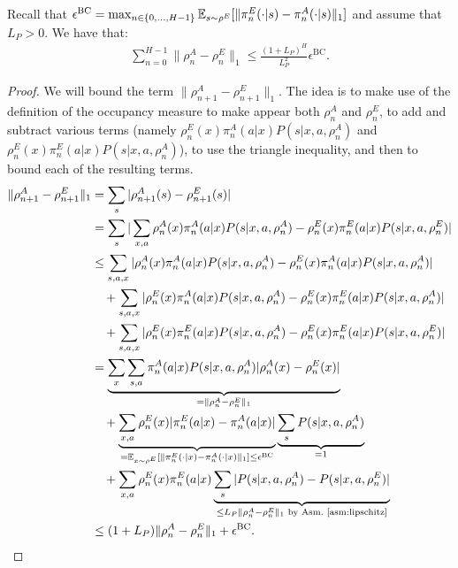 \documentclass{article}
\begin{document}
\begin{lemma}
\label{lem:bc-error-state-distr}
   Recall that $\epsilon^\mathrm{BC} = \max_{n\in\{0,\dots,H-1\}} \mathbb{E}_{s\sim\rho^E}[\|\pi_n^E(\cdot|s) - \pi_n^A(\cdot|s)\|_1]$ and assume that $L_P>0$. We have that:
    \begin{align}
        \sum_{n=0}^{H-1} \|\rho_{n}^A - \rho_{n}^E\|_1 
        \leq \frac{(1+L_P)^H}{L_P^2}\epsilon^\mathrm{BC}.
    \end{align}
\end{lemma}
\begin{proof}
We will bound the term $\|\rho_{n+1}^A - \rho_{n+1}^E\|_1$. The idea is to make use of the definition of the occupancy measure to make appear both $\rho_n^A$ and $\rho_n^E$, to add and subtract various terms (namely $\rho_{n}^E(x)\pi_n^A(a|x) P(s|x,a,\rho_n^A)$ and $\rho_{n}^E(x)\pi_n^E(a|x) P(s|x,a,\rho_n^A)$), to use the triangle inequality, and then to bound each of the resulting terms.
\begin{align}
    \|\rho_{n+1}^A - \rho_{n+1}^E\|_1
    &= \sum_s |\rho_{n+1}^A(s) - \rho_{n+1}^E(s)|
    \\
    &= \sum_s |\sum_{x,a} \rho_{n}^A(x)\pi_n^A(a|x) P(s|x,a,\rho_n^A) - \rho_{n}^E(x)\pi_n^E(a|x) P(s|x,a,\rho_n^E)|
    \\
    &\leq \sum_{s,a,x} |\rho_{n}^A(x)\pi_n^A(a|x) P(s|x,a,\rho_n^A) - \rho_{n}^E(x)\pi_n^A(a|x) P(s|x,a,\rho_n^A)|
    \\ &\quad 
    + \sum_{s,a,x} | \rho_{n}^E(x)\pi_n^A(a|x) P(s|x,a,\rho_n^A) - \rho_{n}^E(x)\pi_n^E(a|x) P(s|x,a,\rho_n^A)|
    \\ &\quad 
    + \sum_{s,a,x} | \rho_{n}^E(x)\pi_n^E(a|x) P(s|x,a,\rho_n^A)- \rho_{n}^E(x)\pi_n^E(a|x) P(s|x,a,\rho_n^E)|
    \\
    &= \underbrace{\sum_x \sum_{s,a} \pi_n^A(a|x) P(s|x,a,\rho_n^A) |\rho_{n}^A(x) - \rho_{n}^E(x)|}_{= \|\rho_{n}^A - \rho_{n}^E\|_1}
    \\ &\quad 
    + \underbrace{\sum_{x,a} \rho_{n}^E(x) |\pi_n^E(a|x) - \pi_n^A(a|x)|}_{= \mathbb{E}_{x\sim \rho^E}[\|\pi_n^E(\cdot|x) - \pi_n^A(\cdot|x)\|_1] \leq \epsilon^\mathrm{BC}} \underbrace{\sum_s P(s|x,a,\rho_n^A)}_{=1}
    \\ &\quad 
    + \sum_{x,a} \rho_{n}^E(x)\pi_n^E(a|x) \underbrace{\sum_s |P(s|x,a,\rho_n^A) - P(s|x,a,\rho_n^E)|}_{\leq L_P \|\rho_{n}^A - \rho_{n}^E\|_1 \text{ by Asm.~\ref{asm:lipschitz}}}
    \\
    &\leq (1+L_P) \|\rho_{n}^A - \rho_{n}^E\|_1 + \epsilon^\mathrm{BC}.
\end{align}

\end{proof}
\end{document}
